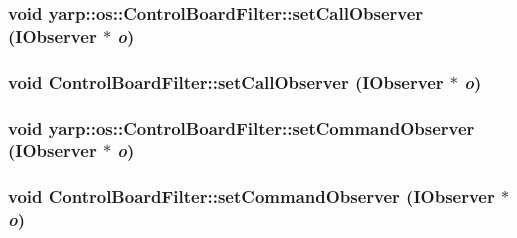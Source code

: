 \label{classyarp_1_1os_1_1_control_board_filter_a27f3aa5419bce6ad6e421ddcb2e52131}
\hypertarget{classyarp_1_1os_1_1_control_board_filter_a534651daebaa7a8324ee8749aeba2469}{
\subsubsection[{setCallObserver}]{\setlength{\rightskip}{0pt plus 5cm}void yarp::os::ControlBoardFilter::setCallObserver ({\bf IObserver} $\ast$ {\em o})}}
\label{classyarp_1_1os_1_1_control_board_filter_a534651daebaa7a8324ee8749aeba2469}
\hypertarget{classyarp_1_1os_1_1_control_board_filter_a72b5abaf68eb361c79d9de5071eb36b9}{
\subsubsection[{setCallObserver}]{\setlength{\rightskip}{0pt plus 5cm}void ControlBoardFilter::setCallObserver ({\bf IObserver} $\ast$ {\em o})}}
\label{classyarp_1_1os_1_1_control_board_filter_a72b5abaf68eb361c79d9de5071eb36b9}
\hypertarget{classyarp_1_1os_1_1_control_board_filter_af40e1e2c791dcbe740e480a257db76b4}{
\subsubsection[{setCommandObserver}]{\setlength{\rightskip}{0pt plus 5cm}void yarp::os::ControlBoardFilter::setCommandObserver ({\bf IObserver} $\ast$ {\em o})}}
\label{classyarp_1_1os_1_1_control_board_filter_af40e1e2c791dcbe740e480a257db76b4}
\hypertarget{classyarp_1_1os_1_1_control_board_filter_a2500ae8300c6ca835f5b25133e1d04ed}{
\subsubsection[{setCommandObserver}]{\setlength{\rightskip}{0pt plus 5cm}void ControlBoardFilter::setCommandObserver ({\bf IObserver} $\ast$ {\em o})}}
